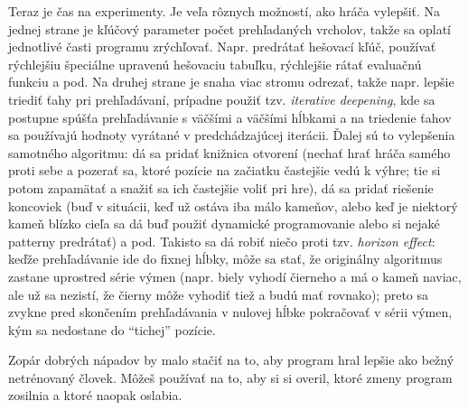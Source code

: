 Teraz je čas na experimenty. Je veľa rôznych možností, ako hráča vylepšiť. Na jednej strane je kľúčový parameter počet prehľadaných vrcholov, takže 
sa oplatí jednotlivé časti programu zrýchľovať. Napr. predrátať hešovací kľúč, používať rýchlejšiu špeciálne upravenú hešovaciu tabuľku, rýchlejšie rátať evaluačnú funkciu
a pod. Na druhej strane je snaha viac stromu odrezať, takže napr. lepšie triediť ťahy pri prehľadávaní, prípadne použiť tzv. {\em iterative deepening}, 
kde sa postupne
spúšťa prehľadávanie s väčšími a väčšími hĺbkami a na triedenie ťahov sa používajú hodnoty vyrátané v predchádzajúcej iterácii. Ďalej sú to vylepšenia samotného algoritmu: 
dá sa pridať knižnica otvorení (nechať hrať hráča samého proti sebe a pozerať sa, ktoré pozície na začiatku častejšie vedú k výhre; 
tie si potom zapamätať a snažiť sa ich častejšie voliť pri hre), dá sa pridať riešenie koncoviek (buď v situácii, keď už ostáva iba málo kameňov, alebo
keď je niektorý kameň blízko cieľa sa dá buď použiť dynamické programovanie alebo si nejaké patterny predrátať) a pod. 
Takisto sa dá robiť niečo proti tzv. {\em horizon effect}: keďže prehľadávanie ide do fixnej hĺbky, môže sa stať, že originálny algoritmus zastane
uprostred série výmen (napr. biely vyhodí čierneho a má o kameň naviac, ale už sa nezistí, že čierny môže vyhodiť tiež a budú mať rovnako); preto sa zvykne pred skončením
prehľadávania v nulovej hĺbke pokračovať v sérii výmen, kým sa nedostane do ``tichej'' pozície. 

Zopár dobrých nápadov by malo stačiť na to, aby program hral lepšie ako bežný netrénovaný človek. Môžeš používať  na to, aby si si overil, ktoré zmeny 
program zosilnia a ktoré naopak oslabia. 

